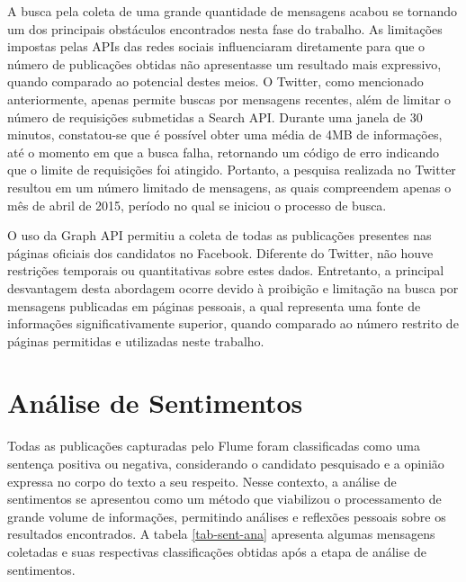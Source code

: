 A busca pela coleta de uma grande quantidade de mensagens acabou se tornando um dos principais obstáculos encontrados nesta fase do trabalho. As limitações impostas pelas APIs das redes sociais influenciaram diretamente para que o número de publicações obtidas não apresentasse um resultado mais expressivo, quando comparado ao potencial destes meios. O Twitter, como mencionado anteriormente, apenas permite buscas por mensagens recentes, além de limitar o número de requisições submetidas a Search API. Durante uma janela de 30 minutos, constatou-se que é possível obter uma média de 4MB de informações, até o momento em que a busca falha, retornando um código de erro indicando que o limite de requisições foi atingido. Portanto, a pesquisa realizada no Twitter resultou em um número limitado de mensagens, as quais compreendem apenas o mês de abril de 2015, período no qual se iniciou o processo de busca.

O uso da Graph API permitiu a coleta de todas as publicações presentes nas páginas oficiais dos candidatos no Facebook. Diferente do Twitter, não houve restrições temporais ou quantitativas sobre estes dados. Entretanto, a principal desvantagem desta abordagem ocorre devido à proibição e limitação na busca por mensagens publicadas em páginas pessoais, a qual representa uma fonte de informações significativamente superior, quando comparado ao número restrito de páginas permitidas e utilizadas neste trabalho.

\section{Análise de Sentimentos}
\label{sec:sent-ana}

Todas as publicações capturadas pelo Flume foram classificadas como uma sentença positiva ou negativa, considerando o candidato pesquisado e a opinião expressa no corpo do texto a seu respeito. Nesse contexto, a análise de sentimentos se apresentou como um método que viabilizou o processamento de grande volume de informações, permitindo análises e reflexões pessoais sobre os resultados encontrados. A tabela \ref{tab-sent-ana} apresenta algumas mensagens coletadas e suas respectivas classificações obtidas após a etapa de análise de sentimentos.

